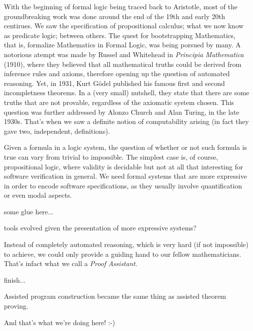 With the beginning of formal logic being traced back to Aristotle, most of the
groundbreaking work was done around the end of the 19th and early 20th centirues.
We saw the specification of propositional calculus; what we now know as predicate logic; between others. The quest for bootstrapping Mathematics, that is, formalize Mathematics in Formal Logic, was
being porsued by many. A notorious atempt was made by Russel and Whitehead in \emph{Principia Mathematica} (1910), where they believed that all mathematical truths
could be derived from inference rules and axioms, therefore opening up the question of automated reasoning. Yet, in 1931, Kurt G\"{o}del published his famous first and second incompletness theorems. In a (very small) nutshell, they state that there are some truths that are not provable, regardless of the axiomatic system chosen. This question was further addressed by Alonzo Church and Alan Turing, in the late 1930s. That's when we saw a definite notion of computability arising (in fact they gave two, independent, definitions). 

Given a formula in a logic system, the question of whether or not such formula is true can vary from trivial to impossible. The simplest case is, of course, propositional logic, where validity is decidable but not at all that interesting
for software verification in general. We need formal systems that are more expressive in order to encode software specifications, as they usually involve quantification or even modal aspects. 

\begin{TODO}
  \item some glue here...
  \item tools evolved given the presentation of more expressive systems?
\end{TODO}

Instead of completely automated reasoning, which is very hard (if not impossible) to achieve, we could only provide a guiding hand to our fellow mathematicians. That's infact what we call a \emph{Proof Assistant}.

\begin{TODO}
  \item finish...
\end{TODO}

\begin{TODO}
  \item Assisted program construction became the same thing as assisted theorem proving.
  \item And that's what we're doing here! :-)
\end{TODO}
